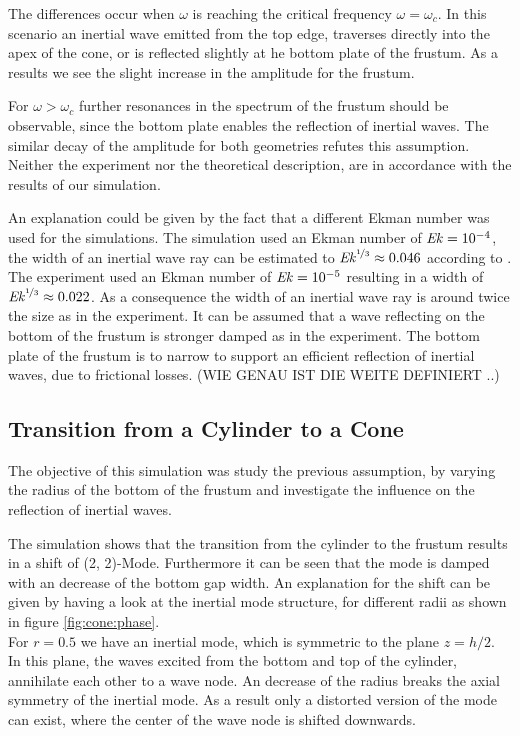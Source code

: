 The differences occur when $\omega$ is reaching the critical frequency $\omega = \omega_c$. In this scenario an inertial wave emitted from the
top edge, traverses directly into the apex of the cone, or is reflected slightly at he bottom plate of the frustum.
As a results we see the slight increase in the amplitude for the frustum.

For $\omega > \omega_c$ further resonances in the spectrum of the frustum should be observable,
since the bottom plate enables the reflection of inertial waves.
The similar decay of the amplitude for both geometries refutes this assumption.
Neither the experiment nor the theoretical description, are in accordance with the results of our simulation.

An explanation could be given by the fact that a different Ekman number was used for the simulations.
The simulation used an Ekman number of $\mbox{\textit{Ek}} = 10^{-4}$, the width
of an inertial wave ray can be estimated to $\mbox{\textit{Ek}}^{\nicefrac{1}{3}}\approx 0.046$ according to \citep{ATPAPER}.
The experiment used an Ekman number of $\mbox{\textit{Ek}} = 10^{-5}$ resulting in a  width of $\mbox{\textit{Ek}}^{\nicefrac{1}{3}}\approx 0.022$.
As a consequence the width of an inertial wave ray is around twice the size as in the experiment.
It can be assumed that a wave reflecting on the bottom of the frustum
is stronger damped as in the experiment.
The bottom plate of the frustum is to narrow to support an efficient reflection
of inertial waves, due to frictional losses.
(WIE GENAU IST DIE WEITE DEFINIERT ..)

\subsection{Transition from a Cylinder to a Cone}

The objective of this simulation was study the previous assumption,
by varying the radius of the bottom of the frustum and investigate the influence
on the reflection of inertial waves.

The simulation shows that the transition from the cylinder
to the frustum results in a shift of (2, 2)-Mode.
Furthermore it can be seen that the mode is damped with an decrease of the bottom gap width.
An explanation for the shift can be given by having a look at the inertial mode structure,
 for different radii as shown in figure \ref{fig:cone:phase}.\\
For $r=0.5$ we have an inertial mode, which is symmetric to the plane $z=h/2$.
In this plane, the waves excited from the bottom and top of the cylinder, annihilate each other to a wave node.
An decrease of the radius breaks the axial symmetry of the inertial mode.
As a result only a distorted version of the mode can exist, where the center of the wave node
is shifted downwards.

